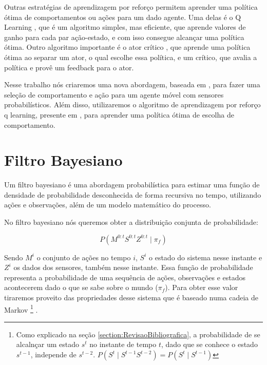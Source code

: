 Outras estratégias de aprendizagem por reforço permitem aprender uma política ótima de comportamentos ou ações para um dado agente. Uma delas é o Q Learning \cite{sutton1998reinforcement,KLMSurvey}, que é um algoritmo simples, mas eficiente, que aprende valores de ganho para cada par ação-estado, e com isso consegue alcançar uma política ótima. Outro algoritmo importante é o ator crítico \cite{sutton1998reinforcement,RicAbeYu07,conf:nips:BhatnagarSGL07,Konda01actor-criticalgorithms}, que aprende uma política ótima ao separar um ator, o qual escolhe essa política, e um crítico, que avalia a política e provê um feedback para o ator.

Nesse trabalho nós criaremos uma nova abordagem, baseada em \cite{Koike:2005,lidoris2008}, para fazer uma seleção de comportamento e ação para um agente móvel com sensores probabilísticos. Além disso, utilizaremos o algoritmo de aprendizagem por reforço q learning, presente em \cite{sutton1998reinforcement}, para aprender uma política ótima de escolha de comportamento.


\section{Filtro Bayesiano} \label{section:FiltroBayesiano}

Um filtro bayesiano é uma abordagem probabilística para estimar uma função de densidade de probabilidade desconhecida de forma recursiva no tempo, utilizando ações e observações, além de um modelo matemático do processo.

No filtro bayesiano nós queremos obter a distribuição conjunta de probabilidade:

\begin{equation}
	P ( M^{0: t} S^{0: t} Z^{0: t} \mid \pi_f )
\end{equation}

Sendo $ M^i $ o conjunto de ações no tempo $ i $, $ S^i $ o estado do sistema nesse instante e $ Z^i $ os dados dos sensores, também nesse instante. Essa função de probabilidade representa a probabilidade de uma sequência de ações, observações e estados acontecerem dado o que se sabe sobre o mundo ($ \pi_f $). Para obter esse valor tiraremos proveito das propriedades desse sistema que é baseado numa cadeia de Markov%
\footnote{Como explicado na seção \ref{section:RevisaoBibliografica}, a probabilidade de se alcalnçar um estado $ s^t $ no instante de tempo $ t $, dado que se conhece o estado $ s^{t-1} $, independe de $ s^{t-2} $. $ P(S^t\mid S^{t-1}S^{t-2})=P(S^t\mid S^{t-1}) $%
}%
.


